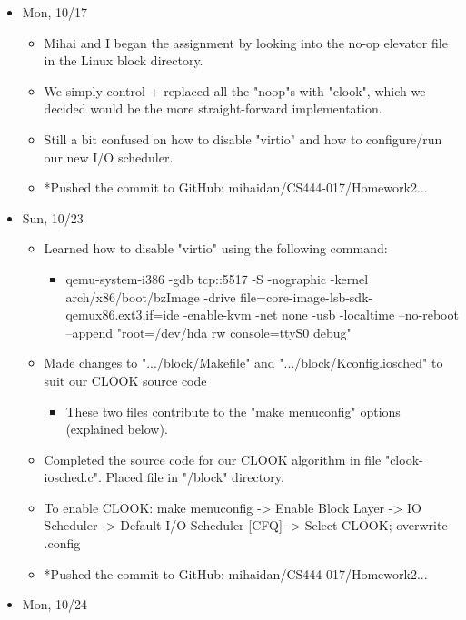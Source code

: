 \documentclass[letterpaper,10pt,onecolumn]{IEEEtran}
\begin{document}
    
    \begin{itemize}
        \item Mon, 10/17
            \begin{itemize} 
        	    \item Mihai and I began the assignment by looking into the no-op elevator file in the Linux block directory.
        	    \item We simply control + replaced all the "noop"s with "clook", which we decided would be the more straight-forward implementation.
        	    \item Still a bit confused on how to disable "virtio" and how to configure/run our new I/O scheduler.
        	    \item *Pushed the commit to GitHub: mihaidan/CS444-017/Homework2...
        	\end{itemize}
        \item Sun, 10/23
            \begin{itemize} 
        	    \item Learned how to disable "virtio" using the following command:
        	        \begin{itemize} 
                        \item qemu-system-i386 -gdb tcp::5517 -S -nographic -kernel arch/x86/boot/bzImage -drive file=core-image-lsb-sdk-qemux86.ext3,if=ide -enable-kvm -net none -usb -localtime --no-reboot --append "root=/dev/hda rw console=ttyS0 debug"
                	\end{itemize}
                \item Made changes to ".../block/Makefile" and ".../block/Kconfig.iosched" to suit our CLOOK source code
                \begin{itemize}
                    \item These two files contribute to the "make menuconfig" options (explained below).
                \end{itemize}
                \item Completed the source code for our CLOOK algorithm in file "clook-iosched.c". Placed file in "/block" directory.
                \item To enable CLOOK:  make menuconfig  ->  Enable Block Layer  ->  IO Scheduler  ->  Default I/O Scheduler [CFQ]  ->  Select CLOOK; overwrite .config
                \item *Pushed the commit to GitHub: mihaidan/CS444-017/Homework2...
        	\end{itemize}
        \item Mon, 10/24

\end{itemize}
\end{document}
